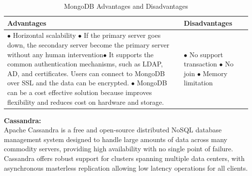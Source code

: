 \begin{table}[H]
\caption{MongoDB Advantages and Disadvantages}
\begin{center}
\begin{tabularx}{17cm}{ |p{8.5cm}|X| } 
 \hline
 \textbf{Advantages} & \textbf{Disadvantages } \\ \hline
 $\bullet$ Horizontal scalability \newline $\bullet$ If the primary server goes down, the secondary server become the primary server without any human intervention\newline $\bullet$ It supports the common authentication mechanisms, such as LDAP, AD, and certificates. Users can connect to MongoDB over SSL and the data can be encrypted. \newline $\bullet$ MongoDB can be a cost effective solution because improves flexibility and reduces cost on hardware and storage. &  $\bullet$ No support transaction \newline $\bullet$ No join \newline $\bullet$ Memory limitation \\ \hline

\end{tabularx}
\end{center}
\end{table}
\newpage
\textbf{\normalsize{Cassandra:}}\\

Apache Cassandra is a free and open-source distributed NoSQL database management system designed to handle large amounts of data across many commodity servers, providing high availability with no single point of failure. Cassandra offers robust support for clusters spanning multiple data centers, with asynchronous masterless replication allowing low latency operations for all clients.\\



